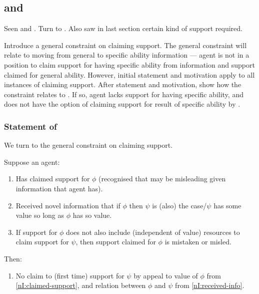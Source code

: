 \subsection{\nI{} and \AR{}}
\label{sec:second-conditional}

\begin{note}
  Seen \uRa{} and \WR{}.
  Turn to \AR{}.
  Also saw in last section certain kind of support required.

  Introduce a general constraint on claiming support.
  The general constraint will relate to moving from general to specific ability information --- agent is not in a position to claim support for having specific ability from information and support claimed for general ability.
  However, initial statement and motivation apply to all instances of claiming support.
  After statement and motivation, show how the constraint relates to \AR{}.
  If so, agent lacks support for having specific ability, and does not have the option of claiming support for result of specific ability by \AR{}.
\end{note}

\subsubsection{Statement of \nI{}}
\label{sec:ni-1}

\begin{note}[\nI{}]
  We turn to the general constraint on claiming support.
  \begin{proposition}[\nI{-}  --- \nI{}]\label{prem:ni}
    Suppose an agent:
    \begin{enumerate}
    \item\label{nI:claimed-support} Has claimed support for \(\phi\) (recognised that may be misleading given information that agent has).
    \item\label{nI:received-info} Received novel information that if \(\phi\) then \(\psi\) is (also) the case/\(\psi\) has some value so long as \(\phi\) has so value.
    \item\label{nI:inclusion} If support for \(\phi\) does not also include (independent of value) resources to claim support for \(\psi\), then support claimed for \(\phi\) is mistaken or misled.
    \end{enumerate}
    Then:
    \begin{enumerate}[resume]
    \item\label{nI:going-by-value} No claim to (first time) support for \(\psi\) by appeal to value of \(\phi\) from \ref{nI:claimed-support}, and relation between \(\phi\) and \(\psi\) from \ref{nI:received-info}.
    \end{enumerate}
  \end{proposition}
\end{note}

